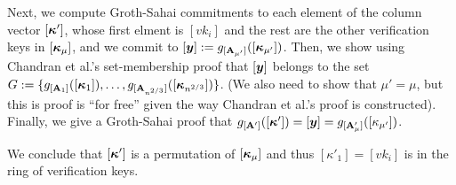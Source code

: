 Next, we compute Groth-Sahai commitments to each element of the column vector $[{\boldsymbol{\kappa}}']$, whose first elment is $[vk_i]$ and the rest are the other verification keys in $[{\boldsymbol{\kappa}}_\mu]$, and we commit to $[{\boldsymbol{y}}] := g_{[\mathbf{{A_{\mu'}}}]}([{\boldsymbol{\kappa}}_{\mu'}])$. Then, we show using Chandran et al.'s set-membership proof that $[{\boldsymbol{y}}]$ belongs to the set $G:=\{g_{[\mathbf{{A}}_1]}([{\boldsymbol{\kappa}}_1]),\allowbreak\ldots,g_{[\mathbf{{A}}_{n^{2/3}}]}([{\boldsymbol{\kappa}}_{n^{2/3}}])\}$. (We also need to show that $\mu'=\mu$, but this is proof is ``for free'' given the way Chandran et al.'s proof is constructed). Finally, we give a Groth-Sahai proof that $g_{[\mathbf{{A}}']}([{\boldsymbol{\kappa}}'])=[{\boldsymbol{y}}]=g_{[\mathbf{{A}}_\mu']}([\kappa_{\mu'}])$.

We conclude that $[{\boldsymbol{\kappa}}']$ is a permutation of $[{\boldsymbol{\kappa}}_\mu]$ and thus $[\kappa'_1]=[vk_i]$ is in the ring of verification keys.


